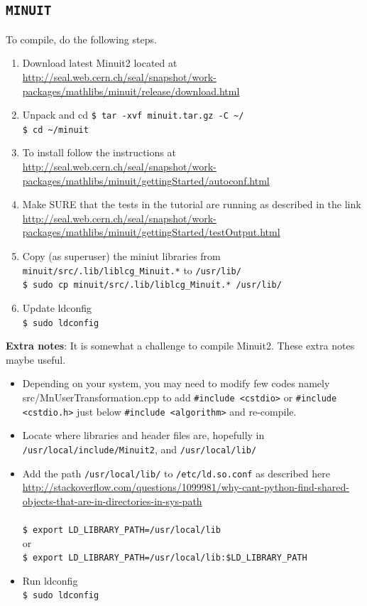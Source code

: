 \documentclass[10pt,letterpaper,oneside]{article}
\newcommand{\minuit}{\texttt{MINUIT}}
\begin{document}
\subsection{\minuit}To compile, do the following steps.
\begin{enumerate}
 \item  Download latest Minuit2 located at\\
\url{http://seal.web.cern.ch/seal/snapshot/work-packages/mathlibs/minuit/release/download.html}
 \item Unpack and cd
          \verb+$ tar -xvf minuit.tar.gz -C ~/+\\
          \verb+$ cd ~/minuit+
 \item  To install follow the instructions at
\\   \url{http://seal.web.cern.ch/seal/snapshot/work-packages/mathlibs/minuit/gettingStarted/autoconf.html}

 \item  Make SURE that the tests in the tutorial are running as described in the link \\ 
 \url{http://seal.web.cern.ch/seal/snapshot/work-packages/mathlibs/minuit/gettingStarted/testOutput.html}
  \item Copy (as superuser) the miniut libraries from   \\
  \verb+minuit/src/.lib/liblcg_Minuit.*+ to \verb+/usr/lib/+ \\
  \verb+$ sudo cp minuit/src/.lib/liblcg_Minuit.* /usr/lib/+
  \item Update ldconfig\\
 \verb+$ sudo ldconfig+
\end{enumerate}

{\bf Extra notes}: It is somewhat a challenge to compile Minuit2. These extra notes maybe useful.
\begin{itemize}
 \item Depending on your system, you may need to modify few codes namely  src/MnUserTransformation.cpp to add  \verb+#include <cstdio>+ or  \verb+#include <cstdio.h>+ just below  \verb+#include <algorithm>+ and re-compile.

 \item Locate where libraries and header files are, hopefully in  
 \verb+/usr/local/include/Minuit2+, and \verb+/usr/local/lib/+

 \item Add the path \verb+/usr/local/lib/+ to \verb+/etc/ld.so.conf+ as described here
 \url{http://stackoverflow.com/questions/1099981/why-cant-python-find-shared-objects-that-are-in-directories-in-sys-path}\\
 \\ \verb+$ export LD_LIBRARY_PATH=/usr/local/lib+ \\ or
 \\ \verb+$ export LD_LIBRARY_PATH=/usr/local/lib:$LD_LIBRARY_PATH+

 \item Run ldconfig
 \\ \verb+$ sudo ldconfig+
\end{itemize}
\end{document}
